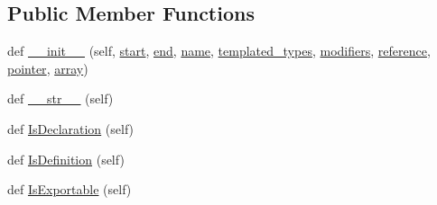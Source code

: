 \subsection*{Public Member Functions}
\begin{DoxyCompactItemize}
\item 
def \mbox{\hyperlink{classgoogletest-master_1_1googlemock_1_1scripts_1_1generator_1_1cpp_1_1ast_1_1_type_aa5585d2dc23a720945a39c92fcf7c68f}{\+\_\+\+\_\+init\+\_\+\+\_\+}} (self, \mbox{\hyperlink{classgoogletest-master_1_1googlemock_1_1scripts_1_1generator_1_1cpp_1_1ast_1_1_node_a6f9eb279a989f9ca27e7d0f1975336d1}{start}}, \mbox{\hyperlink{classgoogletest-master_1_1googlemock_1_1scripts_1_1generator_1_1cpp_1_1ast_1_1_node_a747e90ade89c1764e83b5b649bde18cc}{end}}, \mbox{\hyperlink{classgoogletest-master_1_1googlemock_1_1scripts_1_1generator_1_1cpp_1_1ast_1_1_type_aacbabcf2a987fb5bcb3701866cb668f8}{name}}, \mbox{\hyperlink{classgoogletest-master_1_1googlemock_1_1scripts_1_1generator_1_1cpp_1_1ast_1_1_type_a48357bb38b624eb49b31a87682f53ab1}{templated\+\_\+types}}, \mbox{\hyperlink{classgoogletest-master_1_1googlemock_1_1scripts_1_1generator_1_1cpp_1_1ast_1_1_type_a719db4802c866ccf3210d3221b6538a8}{modifiers}}, \mbox{\hyperlink{classgoogletest-master_1_1googlemock_1_1scripts_1_1generator_1_1cpp_1_1ast_1_1_type_ae619cbc25bb7788fb83ef9bb776e0b22}{reference}}, \mbox{\hyperlink{classgoogletest-master_1_1googlemock_1_1scripts_1_1generator_1_1cpp_1_1ast_1_1_type_af2098cdcf3f1a24c67c9a2023bf91045}{pointer}}, \mbox{\hyperlink{classgoogletest-master_1_1googlemock_1_1scripts_1_1generator_1_1cpp_1_1ast_1_1_type_aefefd9749448a638c075150028f7e3bf}{array}})
\item 
def \mbox{\hyperlink{classgoogletest-master_1_1googlemock_1_1scripts_1_1generator_1_1cpp_1_1ast_1_1_type_aad6c4232a5a38edc8d4166b6febfbe8a}{\+\_\+\+\_\+str\+\_\+\+\_\+}} (self)
\item 
def \mbox{\hyperlink{classgoogletest-master_1_1googlemock_1_1scripts_1_1generator_1_1cpp_1_1ast_1_1_type_a5ca0b9204c6fc40defcdd499164f039b}{Is\+Declaration}} (self)
\item 
def \mbox{\hyperlink{classgoogletest-master_1_1googlemock_1_1scripts_1_1generator_1_1cpp_1_1ast_1_1_type_a58246ca8e8f741d181add7c37bada058}{Is\+Definition}} (self)
\item 
def \mbox{\hyperlink{classgoogletest-master_1_1googlemock_1_1scripts_1_1generator_1_1cpp_1_1ast_1_1_type_a964085017b8352d9dfe441d1608ee5f4}{Is\+Exportable}} (self)
\end{DoxyCompactItemize}
